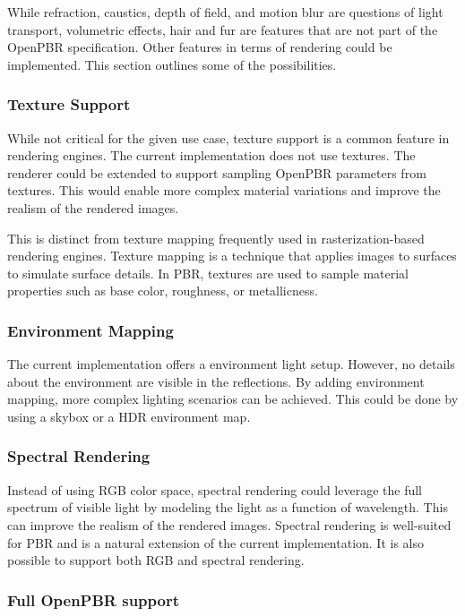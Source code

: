 While refraction, caustics, depth of field, and motion blur are questions of light transport, volumetric effects, hair and fur are features that are not part of the \gls{OpenPBR} specification. Other features in terms of rendering could be implemented. This section outlines some of the possibilities.

\subsubsection*{Texture Support}

While not critical for the given use case, texture support is a common feature in rendering engines. The current implementation does not use textures. The renderer could be extended to support sampling \gls{OpenPBR} parameters from textures. This would enable more complex material variations and improve the realism of the rendered images.

This is distinct from texture mapping frequently used in rasterization-based rendering engines. Texture mapping is a technique that applies images to surfaces to simulate surface details. In \gls{PBR}, textures are used to sample material properties such as base color, roughness, or metallicness.

\subsubsection*{Environment Mapping}

The current implementation offers a environment light setup. However, no details about the environment are visible in the reflections. By adding environment mapping, more complex lighting scenarios can be achieved. This could be done by using a skybox or a \gls{HDR} environment map.

\subsubsection*{Spectral Rendering}

Instead of using \gls{RGB} color space, spectral rendering could leverage the full spectrum of visible light by modeling the light as a function of wavelength. This can improve the realism of the rendered images. Spectral rendering is well-suited for \gls{PBR} and is a natural extension of the current implementation. It is also possible to support both \gls{RGB} and spectral rendering.

\subsubsection*{Full OpenPBR support}

